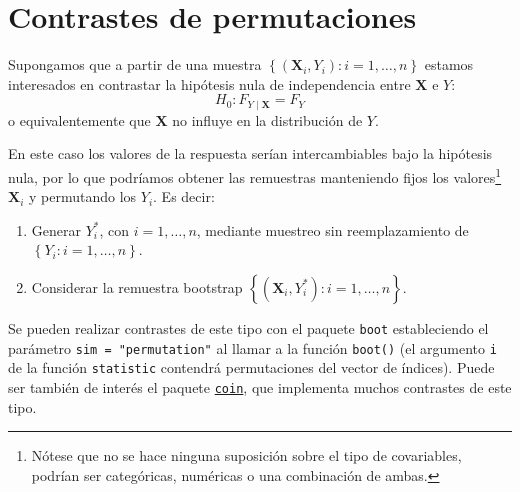 \documentclass[
]{book}
\renewcommand{\mathbf}[1]{\symbf{#1}}
\theoremstyle{break}
\theoremstyle{nonumberplain}
\let\oldfootnote\footnote
\renewcommand\footnote[1]{\oldfootnote{\hspace{2mm}#1}}
\begin{document}
\section{Contrastes de permutaciones}\label{contrastes-de-permutaciones}

Supongamos que a partir de una muestra
\(\left\{ \left( \mathbf{X}_i, Y_i\right): i=1,\ldots, n \right\}\)
estamos interesados en contrastar la hipótesis nula de independencia
entre \(\mathbf{X}\) e \(Y\):
\[H_0: F_{Y \mid \mathbf{X}} = F_Y\]
o equivalentemente que \(\mathbf{X}\) no influye en la distribución de \(Y\).

En este caso los valores de la respuesta serían intercambiables bajo la hipótesis nula,
por lo que podríamos obtener las remuestras manteniendo fijos los valores\footnote{Nótese que
  no se hace ninguna suposición sobre el tipo de covariables,
  podrían ser categóricas, numéricas o una combinación de ambas.}
\(\mathbf{X}_i\) y permutando los \(Y_i\). Es decir:

\begin{enumerate}
\def\labelenumi{\arabic{enumi}.}
\item
  Generar \(Y^{\ast}_i\), con \(i=1,\ldots, n\), mediante muestreo
  sin reemplazamiento de \(\left\{ Y_i: i=1,\ldots, n \right\}\).
\item
  Considerar la remuestra bootstrap
  \(\left\{ \left( \mathbf{X}_i, Y^{\ast}_i\right): i=1,\ldots, n \right\}\).
\end{enumerate}

Se pueden realizar contrastes de este tipo con el paquete \texttt{boot} estableciendo
el parámetro \texttt{sim\ =\ "permutation"} al llamar a la función \texttt{boot()} (el argumento
\texttt{i} de la función \texttt{statistic} contendrá permutaciones del vector de índices).
Puede ser también de interés el paquete \href{https://cran.r-project.org/web/packages/coin/index.html}{\texttt{coin}},
que implementa muchos contrastes de este tipo.
\end{document}
